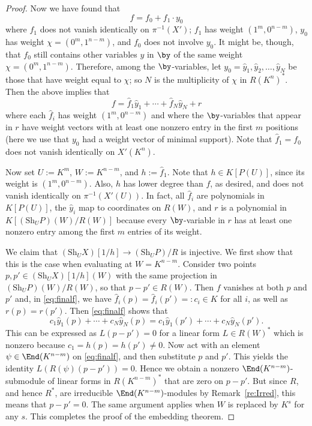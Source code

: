 \documentclass{amsart}
\newcommand{\Sh}{\mathrm{Sh}}
\begin{document}
\begin{proof}
Now we have found that
\[ f=f_0 + f_1 \cdot y_0   \]
where $f_1$ does not vanish identically on $\pi^{-1}(X')$; $f_1$ has weight
$(1^m,0^{n-m})$, $y_0$ has weight $\chi=(0^m,1^{n-m})$, and $f_0$ does
not involve $y_0$. It might be, though, that $f_0$ still
contains other variables $y$ in $\by$ of the same weight
$\chi=(0^{m},1^{n-m})$. Therefore, among the $\by$-variables, 
let $y_0=\hat{y}_1,\hat{y}_2,\ldots,\hat{y}_N$
be those that have weight equal to $\chi$; so $N$ is the multiplicity
of $\chi$ in $R(K^n)^*$. Then the above implies that
\begin{equation} \label{eq:finalf} 
f=\hat{f}_1 \hat{y}_1 + \cdots + \hat{f}_N \hat{y}_N + r 
\end{equation}
where each $\hat{f}_i$ has weight $(1^m,0^{n-m})$ and where the
$\by$-variables that appear in $r$ have weight vectors with at least
one nonzero entry in the first $m$ positions (here we use that $y_0$
had a weight vector of minimal support). Note that $\hat{f}_1=f_0$
does not vanish identically on $X'(K^n)$.

Now set $U:=K^{m}$, $W:=K^{n-m}$, and $h:=\hat{f}_1$.  Note that
$h \in K[P(U)]$, since its weight is $(1^m,0^{n-m})$. Also, $h$ has
lower degree than $f$, as desired, and does not vanish identically on
$\pi^{-1}(X'(U))$. In fact, all $\hat{f}_i$ are polynomials in $K[P(U)]$,
the $\hat{y}_i$ map to coordinates on $R(W)$, and $r$ is a polynomial
in $K[(\Sh_U P)(W)/R(W)]$ because every $\by$-variable in $r$ has at
least one nonzero entry among the first $m$ entries of its weight.

We claim that $(\Sh_U X)[1/h] \to (\Sh_U P)/R$ is injective.  We first
show that this is the case when evaluating at $W=K^{n-m}$. Consider two
points $p,p' \in (\Sh_U X)[1/h](W)$ with the same projection in
$(\Sh_U P)(W)/R(W)$, so that $p-p' \in R(W)$. Then $f$ vanishes at both $p$ and
$p'$ and, in \eqref{eq:finalf}, we have $\hat{f}_i(p)=\hat{f}_i(p')=:c_i
\in K$ for all $i$, as well as $r(p)=r(p')$. Then \eqref{eq:finalf}
shows that
\[ c_1 \hat{y}_1(p) + \cdots + c_N \hat{y}_N(p) =
c_1 \hat{y}_1(p') + \cdots + c_N \hat{y}_N(p').  \]
This can be expressed as $L(p-p')=0$ for a linear form $L \in R(W)^*$
which is nonzero because $c_1=h(p)=h(p') \neq 0$. Now act with an element
$\psi \in \End(K^{n-m})$ on \eqref{eq:finalf}, and then substitute $p$
and $p'$. This yields the identity $L(R(\psi)(p-p'))=0$. Hence we obtain
a nonzero $\End(K^{n-m})$-submodule of linear forms in $R(K^{n-m})^*$
that are zero on $p-p'$. But since $R$, and hence $R^*$, are irreducible
$\End(K^{n-m})$-modules by Remark~\ref{re:Irred}, this means that
$p-p'=0$. The same argument applies when $W$ is replaced by $K^{s}$
for any $s$. This completes the proof of the embedding theorem.
\end{proof}
\end{document}
